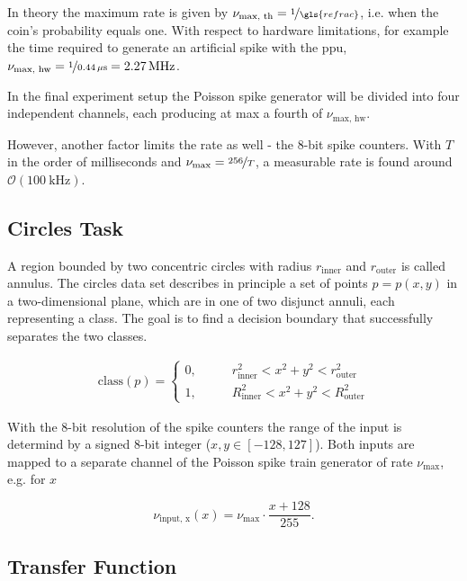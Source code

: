 In theory the maximum rate is given by $\nu_\text{max, th} = \nicefrac{1}{\gls{refrac}}$, i.e. when the coin's probability equals one. With respect to hardware limitations, for example the time required to generate an artificial spike with the \gls{ppu}, $\nu_\text{max, hw} = \nicefrac{1}{\SI{0.44}{\mu \s}} = \SI{2.27}{\mega \Hz}$.

In the final experiment setup the Poisson spike generator will be divided into four independent channels, each producing at max a fourth of $\nu_\text{max, hw}$.

However, another factor limits the rate as well - the 8-bit spike counters. With $T$ in the order of milliseconds and $\nu_\text{max} = \nicefrac{256}{T}$, a measurable rate is found around $\mathcal{O}(\SI{100}{\kilo \Hz})$.

\subsection{Circles Task}
A region bounded by two concentric circles with radius $r_{\text{inner}}$ and $r_{\text{outer}}$ is called annulus. The circles data set describes in principle a set of points $p = p(x,y)$ in a two-dimensional plane, which are in one of two disjunct annuli, each representing a class. The goal is to find a decision boundary that successfully separates the two classes.

\begin{align}
\text{class}(p) =
\begin{cases}
0 ,&\quad \quad r_{\text{inner}}^2 < x^2 + y^2 < r_{\text{outer}}^2 \\
1 ,&\quad \quad R_{\text{inner}}^2 < x^2 + y^2 < R_{\text{outer}}^2
\end{cases}
\end{align}

With the 8-bit resolution of the spike counters the range of the input is determind by a signed 8-bit integer ($x, y \in [-128,127]$). Both inputs are mapped to a separate channel of the Poisson spike train generator of rate $\nu_\text{max}$, e.g. for $x$

\begin{equation}\label{inputfrequency}
\nu_{\text{input, x}}(x) = \nu_\text{max} \cdot \frac{x + 128}{255}.
\end{equation}



\subsection{Transfer Function}


